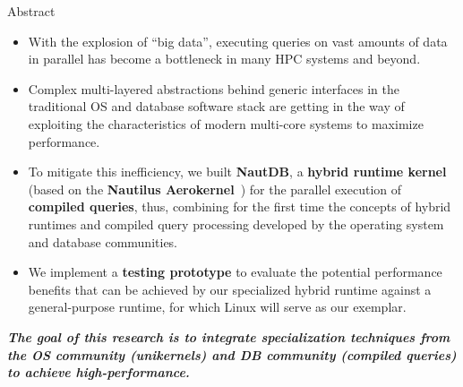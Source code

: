 


\begin{block}{Abstract}
  \begin{itemize}
  \item   With the explosion of ``big data'', executing queries on vast amounts of data in parallel has become a bottleneck in many HPC systems and beyond.
  \item   Complex multi-layered abstractions behind generic interfaces in the traditional OS and database software stack are getting in the way of exploiting the characteristics of modern multi-core systems to maximize performance.
  \item   To mitigate this inefficiency, we built \textbf{NautDB}, a \textbf{hybrid runtime kernel} (based on the \textbf{Nautilus Aerokernel}~\cite{HALE:2015:NAUTILUS}) for the parallel execution of \textbf{compiled queries}, thus, combining for the first time the concepts of hybrid runtimes and compiled query processing developed by the operating system and database communities.
  \item   We implement a \textbf{testing prototype} to evaluate the potential performance benefits that can be achieved by our specialized hybrid runtime against a general-purpose runtime, for which Linux will serve as our exemplar.
  \end{itemize}
\begin{overviewbox}
    \textbf{\emph{The goal of this research is to integrate specialization techniques from the OS community
      (unikernels) and  DB community (compiled queries) to achieve high-performance.}}
\end{overviewbox}
\end{block}

